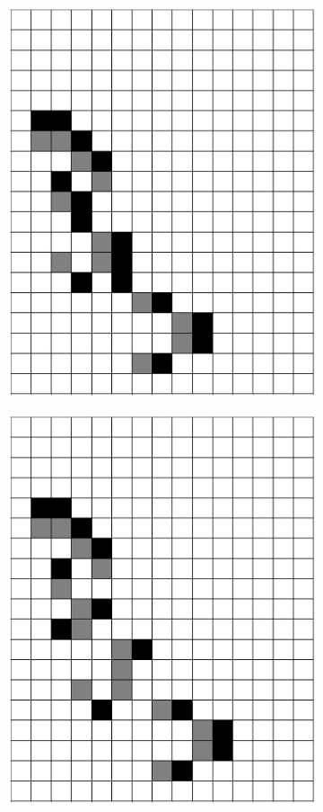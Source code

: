\documentclass[12pt]{article}
\numberwithin{figure}{section} %
\begin{document}
\begin{figure}[H]
\begin{subfigure}{0.3\textwidth}
     \includegraphics[width=\linewidth]{Section4/29.4}
     \subcaption{}
   \end{subfigure}
     \begin{subfigure}{0.3\textwidth}
     \centering
     \includegraphics[width=\linewidth]{Section4/29.5}

\end{subfigure}
\end{figure}
\end{document}

